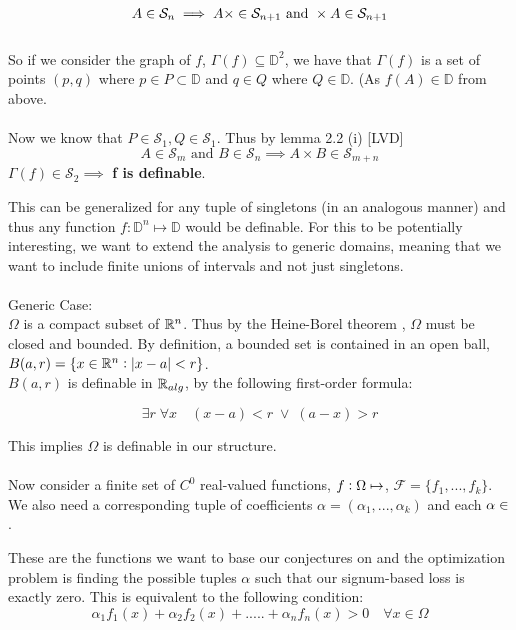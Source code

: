\begin{equation*}
    A \in \mathcal{S}_n\implies A \times\real\in\mathcal{S}_{n+1} \text{ and } \real \times A\in\mathcal{S}_{n+1}
\end{equation*}
\\
So if we consider the graph of $f$, $\Gamma(f)\subseteq\mathbb{D}^2$, we have that $\Gamma(f)$ is a set of points $(p,q)$ where $p\in P\subset\mathbb{D}$ and $q\in Q$ where $Q\in\mathbb{D}$. (As $f(A)\in\mathbb{D}$ from above.
\\\\
Now we know that $P\in\mathcal{S}_1, Q\in\mathcal{S}_1$. Thus by lemma 2.2 (i) [LVD]
\begin{equation*}
    A\in\mathcal{S}_m \text{ and } B\in\mathcal{S}_n \implies A\times B\in\mathcal{S}_{m+n}
\end{equation*}
$\Gamma(f)\in\mathcal{S}_2\implies$ \textbf{f is definable}.

This can be generalized for any tuple of singletons (in an analogous manner) and thus any function $f:\mathbb{D}^n\mapsto\mathbb{D}$ would be definable. For this to be potentially interesting, we want to extend the analysis to generic domains, meaning that we want to include finite unions of intervals and not just singletons.
\\\\
Generic Case:\\
$\Omega$ is a compact subset of $\mathbb{R}^n$. Thus by the Heine-Borel theorem \cite{Caradus_1967}, $\Omega$ must be closed and bounded. By definition, a bounded set is contained in an open ball, $B(a,r) = \{x\in\mathbb{R}^n:|x - a| < r\}$. \\$B(a, r)$ is definable in $\mathbb{R}_{alg}$, by the following first-order formula:

\begin{equation*}
    \exists r\;\forall x \quad (x - a) < r\; \vee \; (a - x) > r
\end{equation*}

This implies $\Omega$ is definable in our structure.\\\\

Now consider a  finite set of $C^0$ real-valued functions, $f:\Omega\mapsto\real$, $\mathcal{F} = \{f_1,...,f_k\}$. We also need a corresponding tuple of coefficients $\alpha = (\alpha_1,...,\alpha_k)$ and each $\alpha\in\real$.

These are the functions we want to base our conjectures on and the optimization problem is finding the possible tuples $\alpha$ such that our signum-based loss is exactly zero. This is equivalent to the following condition:
\begin{equation}
\label{loss}
    \alpha_1f_1(x)+\alpha_2f_2(x)+.....+\alpha_nf_n(x) > 0 \quad\forall x\in\Omega
\end{equation}

